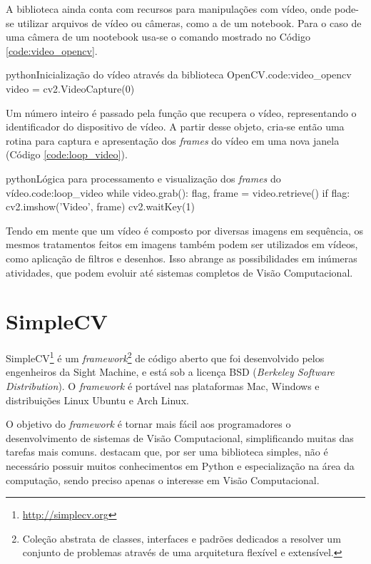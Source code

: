 A biblioteca ainda conta com recursos para manipulações com vídeo, onde pode-se utilizar arquivos de vídeo ou câmeras, como a de um notebook. Para o caso de uma câmera de um nootebook usa-se o comando mostrado no Código \ref{code:video_opencv}.\newline\newline

\begin{code}{python}{Inicialização do vídeo através da biblioteca OpenCV.}{code:video_opencv}
video = cv2.VideoCapture(0)
\end{code}

Um número inteiro é passado pela função que recupera o vídeo, representando o identificador do dispositivo de vídeo. A partir desse objeto, cria-se então uma rotina para captura e apresentação dos \textit{frames} do vídeo em uma nova janela (Código \ref{code:loop_video}).

\begin{code}{python}{Lógica para processamento e visualização dos \textit{frames} do vídeo.}{code:loop_video}
while video.grab():
	flag, frame = video.retrieve()
	if flag:
		cv2.imshow('Video', frame)
		cv2.waitKey(1)
\end{code}

Tendo em mente que um vídeo é composto por diversas imagens em sequência, os mesmos tratamentos feitos em imagens também podem ser utilizados em vídeos, como aplicação de filtros e desenhos. Isso abrange as possibilidades em inúmeras atividades, que podem evoluir até sistemas completos de Visão Computacional.

\section{SimpleCV}

SimpleCV\footnote{\url{http://simplecv.org}} é um \textit{framework}\footnote{Coleção abstrata de classes, interfaces e padrões dedicados a resolver um conjunto de problemas através de uma arquitetura flexível e extensível.} de código aberto que foi desenvolvido pelos engenheiros da Sight Machine, e está sob a licença BSD (\textit{Berkeley Software Distribution}). O \textit{framework} é portável nas plataformas Mac, Windows e distribuições Linux Ubuntu e Arch Linux.

O objetivo do \textit{framework} é tornar mais fácil aos programadores o desenvolvimento de sistemas de Visão Computacional, simplificando muitas das tarefas mais comuns.  destacam que, por ser uma biblioteca simples, não é necessário possuir muitos conhecimentos em Python e especialização na área da computação, sendo preciso apenas o interesse em Visão Computacional.

